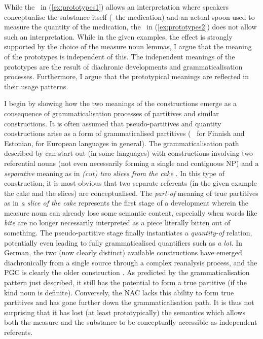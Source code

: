 While the \PGCd\ in (\ref{ex:prototypes1}) allows an interpretation where speakers conceptualise the substance itself (\ie\ the medication) and an actual spoon used to measure the quantity of the medication, the \NACb\ in (\ref{ex:prototypes2}) does not allow such an interpretation.
While in the given examples, the effect is strongly supported by the choice of the measure noun lemmas, I argue that the meaning of the prototypes is independent of this.
The independent meanings of the prototypes are the result of diachronic developments and grammaticalisation processes.
Furthermore, I argue that the prototypical meanings are reflected in their usage patterns.

I begin by showing how the two meanings of the constructions emerge as a consequence of grammaticalisation processes of partitives and similar constructions.
It is often assumed that pseudo-partitives and quantity constructions arise as a form of grammaticalised partitives (\eg\ \citealp[536--539]{Koptjevskaja2001} for Finnish and Estonian, \citealp[559]{Koptjevskaja2001} for European languages in general).
The grammaticalisation path described by \citet[esp.\ 526--530]{Koptjevskaja2001} can start out (in some languages) with constructions involving two referential nouns (not even necessarily forming a single and contiguous NP) and a \textit{separative} meaning as in \textit{(cut) two slices from the cake} \citep[535]{Koptjevskaja2001}.
In this type of construction, it is most obvious that two separate referents (in the given example the cake and the slices) are conceptualised.
The \textit{part-of} meaning of true partitives as in \textit{a slice of the cake} represents the first stage of a development wherein the measure noun can already lose some semantic content, especially when words like \textit{bite} are no longer necessarily interpreted as a piece literally bitten out of something.
The pseudo-partitive stage finally instantiates a \textit{quantity-of} relation, potentially even leading to fully grammaticalised quantifiers such as \textit{a lot}.
In German, the two (now clearly distinct) available constructions have emerged diachronically from a single source through a complex reanalysis process, and the PGC is clearly the older construction \citep[2--4]{Zimmer2015}.
As predicted by the grammaticalisation pattern just described, it still has the potential to form a true partitive (if the kind noun is definite).
Conversely, the NAC lacks this ability to form true partitives and has gone further down the grammaticalisation path.
It is thus not surprising that it has lost (at least prototypically) the semantics which allows both the measure and the substance to be conceptually accessible as independent referents.
